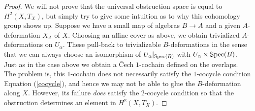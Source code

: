 \documentclass[11pt]{amsart}
\def\Spec{{\rm Spec}}
\begin{document}
\begin{proof}
We will not prove that the universal obstruction space is equal to $H^2(X,T_X)$, but simply try to give some intuition as to why this cohomology group shows up. 
Suppose we have a small map of algebras $B \to A$ and a given $A$-deformation $X_A$ of $X$. 
Choosing an affine cover as above, we obtain trivialized $A$-deformations on $U_{\alpha}$. 
These pull-back to trivializable $B$-deformations in the sense that we can always choose an isomorphism of $U_{\alpha}|_{\Spec(B)}$ with $U_\alpha \times \Spec(B)$. 
Just as in the case above we obtain a \v{C}ech $1$-cochain defined on the overlaps. 
The problem is, this $1$-cochain does not necessarily satisfy the $1$-cocycle condition Equation (\ref{cocycle}), and hence we may not be able to glue the $B$-deformation along $X$. 
However, its failure {\em does} satisfy the $2$-cocycle condition so that the obstruction determines an element in $H^2(X, T_X)$. 
\end{proof}
\end{document}
